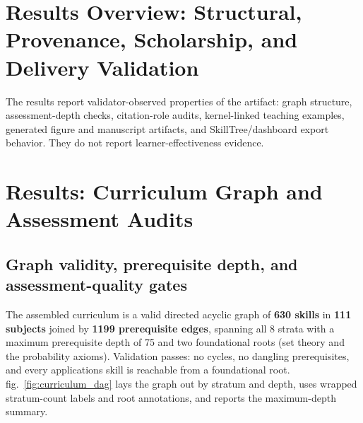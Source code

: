 \documentclass[
  english,
]{article}
\begin{document}
\newpage

\section{Results Overview: Structural, Provenance, Scholarship, and
Delivery
Validation}\label{results-overview-structural-provenance-scholarship-and-delivery-validation}

The results report validator-observed properties of the artifact: graph
structure, assessment-depth checks, citation-role audits, kernel-linked
teaching examples, generated figure and manuscript artifacts, and
SkillTree/dashboard export behavior. They do not report
learner-effectiveness evidence.

\newpage

\section{Results: Curriculum Graph and Assessment
Audits}\label{sec:results-curriculum-graph-assessment}

\subsection{Graph validity, prerequisite depth, and assessment-quality
gates}\label{graph-validity-prerequisite-depth-and-assessment-quality-gates}

The assembled curriculum is a valid directed acyclic graph of
\textbf{630 skills} in \textbf{111 subjects} joined by \textbf{1199
prerequisite edges}, spanning all 8 strata with a maximum prerequisite
depth of 75 and two foundational roots (set theory and the probability
axioms). Validation passes: no cycles, no dangling prerequisites, and
every applications skill is reachable from a foundational root.
fig.~\ref{fig:curriculum_dag} lays the graph out by stratum and depth,
uses wrapped stratum-count labels and root annotations, and reports the
maximum-depth summary.
\end{document}
